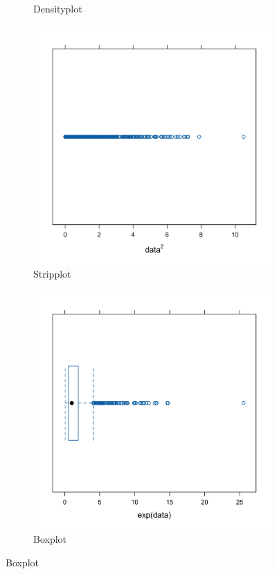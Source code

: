 \documentclass[10pt, a4paper, titlepage]{article}
\begin{document}
\begin{figure}[htbp]
\begin{subfigure}{0.45\textwidth}
        \caption{Densityplot}
        \label{fig:sub2}
    \end{subfigure}
    \vspace{0.5cm}
    \begin{subfigure}{0.45\textwidth}
        \centering
        \includegraphics[width=\textwidth]{stripplot.png}
        \caption{Stripplot}
        \label{fig:sub3}
    \end{subfigure}
    \hfill
    \begin{subfigure}{0.45\textwidth}
        \centering
        \includegraphics[width=\linewidth]{bwplot.png}
        \caption{Boxplot}
        \label{fig:sub4}
    \end{subfigure}


\end{figure}
\end{document}
